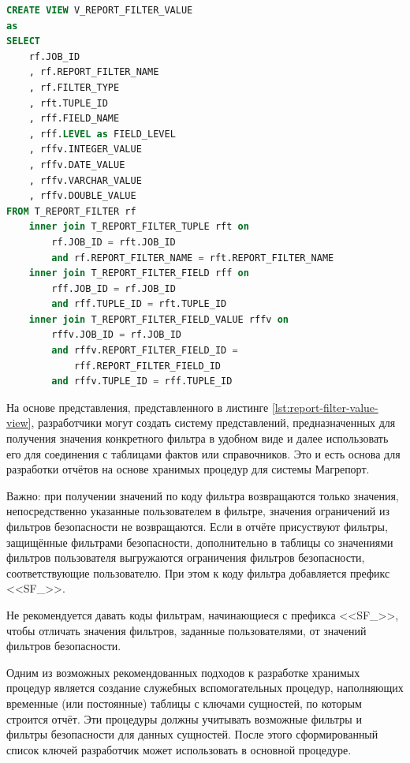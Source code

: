 \documentclass[../user-manual.tex]{subfiles}
\begin{document}
	
\begin{lstlisting}[language=SQL, caption={Представление для получения значений выбора в фильтрах}, label={lst:report-filter-value-view}]
CREATE VIEW V_REPORT_FILTER_VALUE
as
SELECT 
	rf.JOB_ID	
	, rf.REPORT_FILTER_NAME 
	, rf.FILTER_TYPE
	, rft.TUPLE_ID	
	, rff.FIELD_NAME
	, rff.LEVEL as FIELD_LEVEL 
	, rffv.INTEGER_VALUE                 
	, rffv.DATE_VALUE                    
	, rffv.VARCHAR_VALUE                 
	, rffv.DOUBLE_VALUE            
FROM T_REPORT_FILTER rf 
    inner join T_REPORT_FILTER_TUPLE rft on 
    	rf.JOB_ID = rft.JOB_ID
	    and rf.REPORT_FILTER_NAME = rft.REPORT_FILTER_NAME
    inner join T_REPORT_FILTER_FIELD rff on 
    	rff.JOB_ID = rf.JOB_ID
   	    and rff.TUPLE_ID = rft.TUPLE_ID	
    inner join T_REPORT_FILTER_FIELD_VALUE rffv on 
    	rffv.JOB_ID = rf.JOB_ID
	    and rffv.REPORT_FILTER_FIELD_ID = 
	    	rff.REPORT_FILTER_FIELD_ID
	    and rffv.TUPLE_ID = rff.TUPLE_ID
\end{lstlisting}

	На основе представления, представленного в листинге \ref{lst:report-filter-value-view}, разработчики могут создать систему представлений, предназначенных для получения значения конкретного фильтра в удобном виде и далее использовать его для соединения с таблицами фактов или справочников. Это и есть основа для разработки отчётов на основе хранимых процедур для системы Магрепорт.
	
	Важно: при получении значений по коду фильтра возвращаются только значения, непосредственно указанные пользователем в фильтре, значения ограничений из фильтров безопасности не возвращаются. Если в отчёте присуствуют фильтры, защищённые фильтрами безопасности, дополнительно в таблицы со значениями фильтров пользователя выгружаются ограничения фильтров безопасности, соответствующие пользователю. При этом к коду фильтра добавляется префикс <<SF\_>>.
	
	\begin{devnote}
		Не рекомендуется давать коды фильтрам, начинающиеся с префикса <<SF\_>>, чтобы отличать значения фильтров, заданные пользователями, от значений фильтров безопасности.
	\end{devnote}

	Одним из возможных рекомендованных подходов к разработке хранимых процедур является создание служебных вспомогательных процедур, наполняющих временные (или постоянные) таблицы с ключами сущностей, по которым строится отчёт. Эти процедуры должны учитывать возможные фильтры и фильтры безопасности для данных сущностей. После этого сформированный список ключей разработчик может использовать в основной процедуре.
\end{document}
